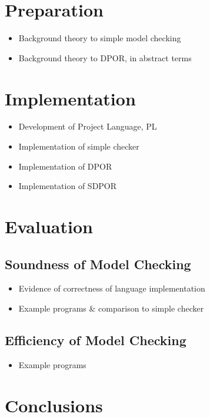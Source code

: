 \documentclass[12pt,a4paper,twoside,openright]{report}
\begin{document}
\chapter{Preparation}

\begin{itemize}
	\item Background theory to simple model checking
	\item Background theory to DPOR, in abstract terms
\end{itemize}

\chapter{Implementation}

\begin{itemize}
	\item Development of Project Language, PL
	\item Implementation of simple checker
	\item Implementation of DPOR
	\item Implementation of SDPOR
	
\end{itemize}

\chapter{Evaluation}

\section{Soundness of Model Checking}

\begin{itemize}
	\item Evidence of correctness of language implementation
	\item Example programs \& comparison to simple checker
\end{itemize}

\section{Efficiency of Model Checking}

\begin{itemize}
	\item Example programs
\end{itemize}

\chapter{Conclusions}
\end{document}
